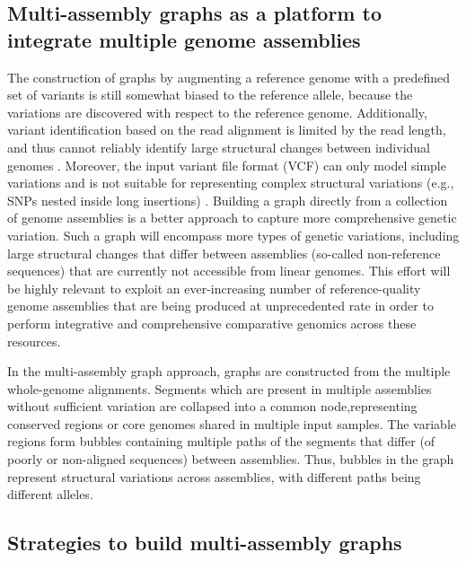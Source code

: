 \documentclass[../main.tex]{subfiles}
\begin{document}
\subsection{Multi-assembly graphs as a platform to integrate multiple genome assemblies}

The construction of graphs by augmenting a reference genome with a predefined set of variants  is still somewhat biased to the reference allele, because the variations are discovered with respect to the reference genome. Additionally, variant identification based on the read alignment is limited by the read length, and thus cannot reliably identify large structural changes between individual genomes \citep{feng2020higher}. Moreover, the input variant file format (VCF) can only model simple variations and is not suitable for representing complex structural variations (e.g., SNPs nested inside long insertions) \citep{letcher2021enabling}.  Building a graph directly from a collection of genome assemblies is a better approach to capture more comprehensive genetic variation. Such a graph will encompass more types of genetic variations, including large structural changes that differ between assemblies (so-called non-reference sequences) that are currently not accessible from linear genomes. This effort will be highly relevant to exploit an ever-increasing number of reference-quality genome assemblies that are being produced at unprecedented rate in order to perform integrative and comprehensive comparative genomics across these resources. 

In the multi-assembly graph approach, graphs are constructed from the multiple whole-genome alignments. Segments which are present in multiple assemblies without sufficient variation are collapsed into a common node,representing conserved regions or core genomes shared in multiple input samples. The variable regions form bubbles containing multiple paths of the segments that differ (of poorly or non-aligned sequences) between assemblies. Thus, bubbles in the graph represent structural variations across assemblies, with different paths being different alleles. 

\subsection{Strategies to build multi-assembly graphs}
\end{document}
